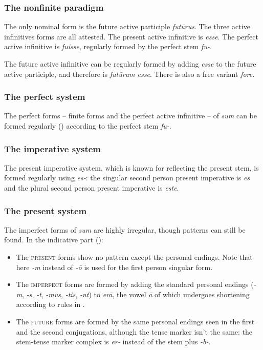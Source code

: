 \documentclass[a4paper, oneside]{report}
\newcommand{\corpus}[1]{\emph{#1}}
\newcommand*{\category}[1]{\textsc{#1}}
\begin{document}
\subsubsection{The nonfinite paradigm}\label{sec:verb-inflection.irregular.sum.nonfinite}

The only nominal form is the future active participle \corpus{futūrus}.
The three active infinitives forms are all attested.
The present active infinitive is \corpus{esse}.
The perfect active infinitive is \corpus{fuisse}, 
regularly formed by the perfect stem \corpus{fu-}.

The future active infinitive can be regularly formed by adding \corpus{esse} 
to the future active participle,
and therefore is \corpus{futūrum esse}.
There is also a free variant \corpus{fore}.

\subsubsection{The perfect system}

The perfect forms -- finite forms and the perfect active infinitive -- 
of \corpus{sum} can be formed regularly ()
according to the perfect stem \corpus{fu-}.

\subsubsection{The imperative system}

The present imperative system, 
which is known for reflecting the present stem,
is formed regularly using \corpus{es-}:
the singular second person present imperative is \corpus{es}
and the plural second person present imperative is \corpus{este}.

\subsubsection{The present system}

The imperfect forms of \corpus{sum} are highly irregular,
though patterns can still be found.
In the indicative part (): 
\begin{itemize}
    \item The \category{present} forms show no pattern
    except the personal endings.
    Note that here \corpus{-m} instead of \corpus{-\={o}}
    is used for the first person singular form.
    \item The \category{imperfect} forms are formed 
    by adding the standard personal endings 
    (\corpus{-m}, \corpus{-s}, \corpus{-t}, 
    \corpus{-mus}, \corpus{-tis}, \corpus{-nt})
    to \corpus{er\={a}},
    the vowel \corpus{\={a}} of which 
    undergoes shortening according to rules in .
    \item The \category{future} forms are formed by 
    the same personal endings seen in the first and the second conjugations,
    although the tense marker isn't the same: 
    the stem-tense marker complex is \corpus{er-}
    instead of the stem plus \corpus{-b-}.
\end{itemize}
\end{document}
